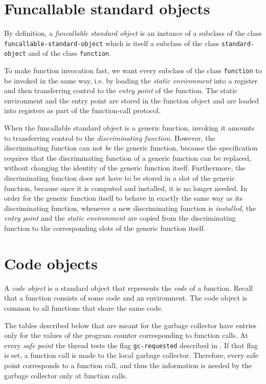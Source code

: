 \section{Funcallable standard objects}
\label{sec-data-representation-funcallable-standard-objects}

By definition, a \emph{funcallable standard object} is an instance of
a subclass of the class \texttt{funcallable-standard-object} which is
itself a subclass of the class \texttt{standard-object} and of the
class \texttt{function}. 

To make function invocation fast, we want every subclass of the class
\texttt{function} to be invoked in the same way, i.e. by loading the
\emph{static environment} into a register and then transferring
control to the \emph{entry point} of the function. The static
environment and the entry point are stored in the function object
and are loaded into registers as part of the function-call protocol.

When the funcallable standard object is a generic function, invoking
it amounts to transferring control to the \emph{discriminating
  function}.  However, the discriminating function can not \emph{be}
the generic function, because the \clos{} specification requires that
the discriminating function of a generic function can be replaced,
without changing the identity of the generic function itself.
Furthermore, the discriminating function does not have to be stored in
a slot of the generic function, because once it is computed and
installed, it is no longer needed.  In order for the generic function
itself to behave in exactly the same way as its discriminating
function, whenever a new discriminating function is \emph{installed},
the \emph{entry point} and the \emph{static environment} are copied
from the discriminating function to the corresponding slots of the
generic function itself.

\section{Code objects}
\label{data-representation-code-objects}

A \emph{code object} is a standard object that represents the
\emph{code} of a function.  Recall that a function consists of some
code and an environment.  The code object is common to all functions
that share the same code.

The tables described below that are meant for the garbage collector
have entries only for the values of the program counter corresponding
to function calls.  At every \emph{safe point} the thread tests the
flag \texttt{gc-requested} described in
.
If that flag is set, a function call is made to the local garbage
collector.  Therefore, every safe point corresponds to a function
call, and thus the information is needed by the garbage collector only
at function calls.

